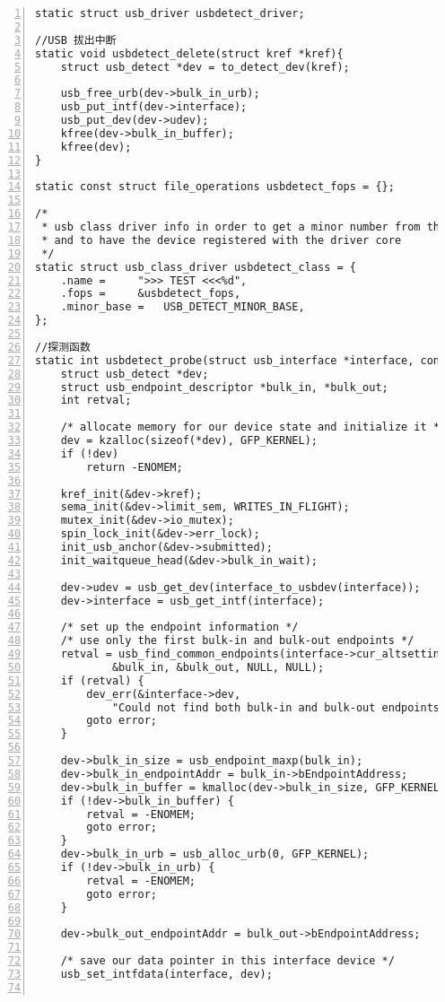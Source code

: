 \documentclass{article}
\begin{document}
\begin{enumerate}
\begin{lstlisting}[numbers=left]
static struct usb_driver usbdetect_driver;

//USB 拔出中断
static void usbdetect_delete(struct kref *kref){
	struct usb_detect *dev = to_detect_dev(kref);

	usb_free_urb(dev->bulk_in_urb);
	usb_put_intf(dev->interface);
	usb_put_dev(dev->udev);
	kfree(dev->bulk_in_buffer);
	kfree(dev);
}

static const struct file_operations usbdetect_fops = {};

/*
 * usb class driver info in order to get a minor number from the usb core,
 * and to have the device registered with the driver core
 */
static struct usb_class_driver usbdetect_class = {
	.name =		">>> TEST <<<%d",
	.fops =		&usbdetect_fops,
	.minor_base =	USB_DETECT_MINOR_BASE,
};

//探测函数
static int usbdetect_probe(struct usb_interface *interface, const struct usb_device_id *id){
	struct usb_detect *dev;
	struct usb_endpoint_descriptor *bulk_in, *bulk_out;
	int retval;

	/* allocate memory for our device state and initialize it */
	dev = kzalloc(sizeof(*dev), GFP_KERNEL);
	if (!dev)
		return -ENOMEM;

	kref_init(&dev->kref);
	sema_init(&dev->limit_sem, WRITES_IN_FLIGHT);
	mutex_init(&dev->io_mutex);
	spin_lock_init(&dev->err_lock);
	init_usb_anchor(&dev->submitted);
	init_waitqueue_head(&dev->bulk_in_wait);

	dev->udev = usb_get_dev(interface_to_usbdev(interface));
	dev->interface = usb_get_intf(interface);

	/* set up the endpoint information */
	/* use only the first bulk-in and bulk-out endpoints */
	retval = usb_find_common_endpoints(interface->cur_altsetting,
			&bulk_in, &bulk_out, NULL, NULL);
	if (retval) {
		dev_err(&interface->dev,
			"Could not find both bulk-in and bulk-out endpoints\n");
		goto error;
	}

	dev->bulk_in_size = usb_endpoint_maxp(bulk_in);
	dev->bulk_in_endpointAddr = bulk_in->bEndpointAddress;
	dev->bulk_in_buffer = kmalloc(dev->bulk_in_size, GFP_KERNEL);
	if (!dev->bulk_in_buffer) {
		retval = -ENOMEM;
		goto error;
	}
	dev->bulk_in_urb = usb_alloc_urb(0, GFP_KERNEL);
	if (!dev->bulk_in_urb) {
		retval = -ENOMEM;
		goto error;
	}

	dev->bulk_out_endpointAddr = bulk_out->bEndpointAddress;

	/* save our data pointer in this interface device */
	usb_set_intfdata(interface, dev);


\end{lstlisting}
\end{enumerate}
\end{document}
